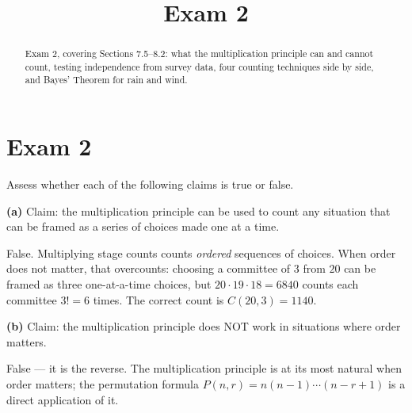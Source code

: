 \documentclass[12pt]{ximera}
\title{Exam 2}
\begin{document}
\begin{abstract}
Exam 2, covering Sections 7.5--8.2: what the multiplication principle can and cannot
count, testing independence from survey data, four counting techniques side by side,
and Bayes' Theorem for rain and wind.
\end{abstract}
\maketitle

\section*{Exam 2}

\begin{problem}
Assess whether each of the following claims is true or false.

\begin{prompt}
\textbf{(a)} Claim: the multiplication principle can be used to count any situation that
can be framed as a series of choices made one at a time.

\begin{multipleChoice}
\end{multipleChoice}

\begin{feedback}
False. Multiplying stage counts counts \emph{ordered} sequences of choices. When order
does not matter, that overcounts: choosing a committee of $3$ from $20$ can be framed as
three one-at-a-time choices, but $20\cdot 19\cdot 18=6840$ counts each committee $3!=6$
times. The correct count is $C(20,3)=1140$.
\end{feedback}
\end{prompt}

\begin{prompt}
\textbf{(b)} Claim: the multiplication principle does NOT work in situations where order
matters.

\begin{multipleChoice}
\end{multipleChoice}

\begin{feedback}
False --- it is the reverse. The multiplication principle is at its most natural when
order matters; the permutation formula $P(n,r)=n(n-1)\cdots(n-r+1)$ is a direct
application of it.
\end{feedback}
\end{prompt}
\end{problem}
\end{document}

